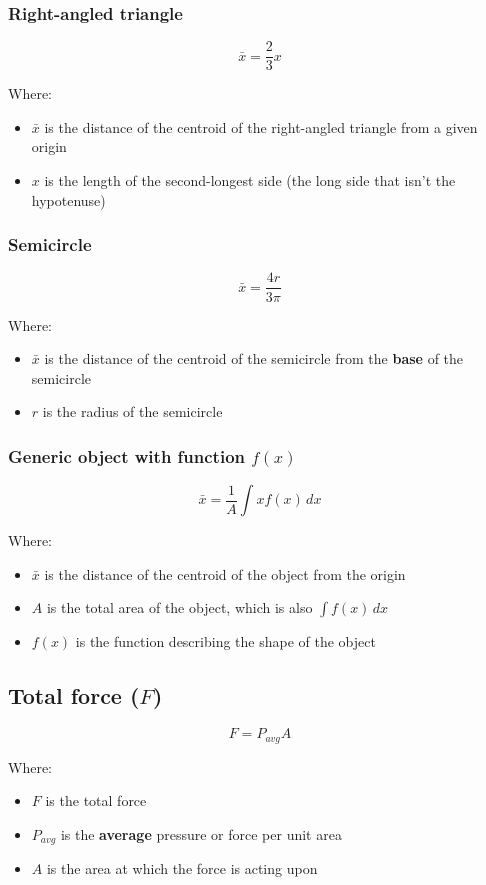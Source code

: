 \documentclass[11pt]{article}
\begin{document}
\subsubsection{Right-angled triangle}
\label{sec:orgf771812}
\[\bar{x} = \frac{2}{3} x\]

Where:
\begin{itemize}
\item \(\bar{x}\) is the distance of the centroid of the right-angled triangle from a given origin
\item \(x\) is the length of the second-longest side (the long side that isn't the hypotenuse)
\end{itemize}

\subsubsection{Semicircle}
\label{sec:org2266665}
\[\bar{x} = \frac{4r}{3\pi}\]

Where:
\begin{itemize}
\item \(\bar{x}\) is the distance of the centroid of the semicircle from the \textbf{base} of the semicircle
\item \(r\) is the radius of the semicircle
\end{itemize}

\subsubsection{Generic object with function \(f(x)\)}
\label{sec:org9c38fec}
\[\bar{x} = \frac{1}{A} \int x f(x) \, dx\]

Where:
\begin{itemize}
\item \(\bar{x}\) is the distance of the centroid of the object from the origin
\item \(A\) is the total area of the object, which is also \(\int f(x) \, dx\)
\item \(f(x)\) is the function describing the shape of the object
\end{itemize}

\subsection{Total force (\(F\))}
\label{sec:org064b78f}
\[F = P_{avg} A\]

Where:
\begin{itemize}
\item \(F\) is the total force
\item \(P_{avg}\) is the \textbf{average} pressure or force per unit area
\item \(A\) is the area at which the force is acting upon
\end{itemize}
\end{document}
